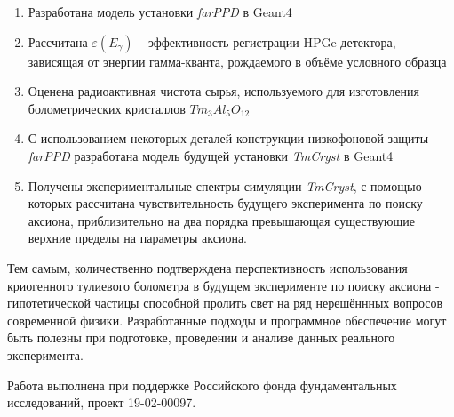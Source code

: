 \documentclass[a4paper,article,14pt]{extarticle}
\begin{document}
\begin{enumerate}
    \item Разработана модель установки \textit{farPPD} в Geant4
    \item Рассчитана $\varepsilon \left( E_{\gamma} \right)$ -- эффективность регистрации HPGe-детектора, зависящая от энергии гамма-кванта, рождаемого в объёме условного образца
    \item Оценена радиоактивная чистота сырья, используемого для изготовления болометрических кристаллов $Tm_3Al_5O_{12}$
    \item С использованием некоторых деталей конструкции низкофоновой защиты \textit{farPPD} разработана модель будущей установки \textit{TmCryst} в Geant4
    \item Получены экспериментальные спектры симуляции \textit{TmCryst}, с помощью которых рассчитана чувствительность будущего эксперимента по поиску аксиона, приблизительно на два порядка превышающая существующие верхние пределы на параметры аксиона.
    \end{enumerate}
    
Тем самым, количественно подтверждена перспективность использования криогенного тулиевого болометра в будущем эксперименте по поиску аксиона - гипотетической частицы способной пролить свет на ряд нерешённных вопросов современной физики. Разработанные подходы и программное обеспечение могут быть полезны при подготовке, проведении и анализе данных реального эксперимента.
    
Работа выполнена при поддержке Российского фонда фундаментальных исследований, проект 19-02-00097.
    

\newpage

\printbibliography[title={Источники}]{}
\end{document}
